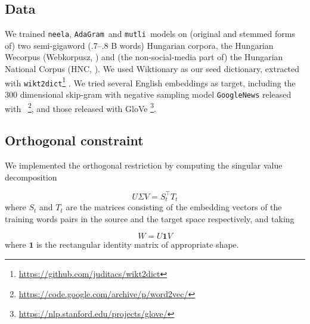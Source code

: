 \documentclass[11pt]{article}
\newcommand{\neelakantan}{\texttt{neela}}
\newcommand{\adagram}{\texttt{AdaGram}}
\newcommand{\mutli}{\texttt{mutli}}
\begin{document}
\subsection{Data}

We trained \neelakantan, \adagram~and \mutli~models on (original and stemmed
forms of) two semi-gigaword (.7--.8 B words) Hungarian corpora, the Hungarian
Wecorpus (Webkorpusz, \cite{Halacsy:2004}) and (the non-social-media part of)
the Hungarian National Corpus (HNC, \cite{Oravecz:2014}).  We used Wiktionary
as our seed dictionary, extracted with
\texttt{wikt2dict}\footnote{\url{https://github.com/juditacs/wikt2dict}}
\citep{Acs:2013}. We tried several English embeddings as target, including the
300 dimensional skip-gram with negative sampling model \texttt{GoogleNews}
released with
\wordtovec~\citep{Mikolov:2013f}\footnote{\url{https://code.google.com/archive/p/word2vec/}},
and those released with GloVe
\citep{Pennington:2014}\footnote{\url{https://nlp.stanford.edu/projects/glove/}}.

\subsection{Orthogonal constraint}

We implemented the orthogonal restriction by computing the singular value
decomposition

\[U\Sigma V=S_t^\top T_t\] where $S_t$ and $T_t$ are the matrices consisting of
the embedding vectors of
the training words pairs in the source and the target space respectively, and
taking

\[W=U\mathbf{1}V\]
where $\mathbf 1$ is the rectangular identity matrix of appropriate shape.
\end{document}
